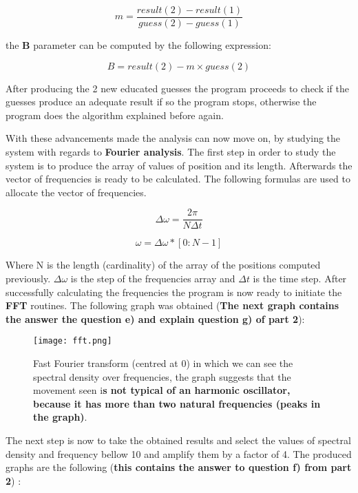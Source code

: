 \documentclass[letterpaper,12pt]{article}
\begin{document}
\begin{equation*}
m=\frac{result(2)-result(1)}{guess(2)-guess(1)}
\end{equation*}
 
the \textbf{B} parameter can be computed by the following expression:

\begin{equation*}
B=result(2)-m \times guess(2)
\end{equation*}

\indent
After producing the 2 new educated guesses the program proceeds to check if the guesses produce an adequate result if so the program stops, otherwise the program does the algorithm explained before again.

\indent 

With these advancements made the analysis can now move on, by studying the system with regards to \textbf{Fourier analysis}. The first step in order to study the system is to produce the array of values of position and its length. Afterwards the vector of frequencies is ready to be calculated. The following formulas are used to allocate the vector of frequencies. 

\begin{equation*}
\Delta \omega= \frac{2 \pi}{N \Delta t} 
\end{equation*}

\begin{equation*}
\omega= \Delta \omega *[0:N-1]
\end{equation*}

Where N is the length (cardinality) of the array of the positions computed previously. $\Delta \omega$ is the step of the frequencies array and $\Delta t$ is the time step. After successfully calculating the frequencies the program is now ready to initiate the \textbf{FFT} routines. The following graph was obtained (\textbf{The next graph contains the answer the question e) and explain question g) of part 2}):

\begin{figure}[h]
  \centering
    \texttt{[image: fft.png]}     
    \caption{Fast Fourier transform (centred at 0) in which we can see the spectral density over frequencies, the graph suggests that  the movement seen i\textbf{s not typical of an harmonic oscillator, because it has more than two natural frequencies (peaks in the graph)}. }
\end{figure} 

\indent 
The next step is now to take the obtained results and select the values of spectral density and frequency bellow 10 and amplify them by a factor of 4. The produced graphs are the following (\textbf{this contains the answer to question f) from part 2}) :
\end{document}
